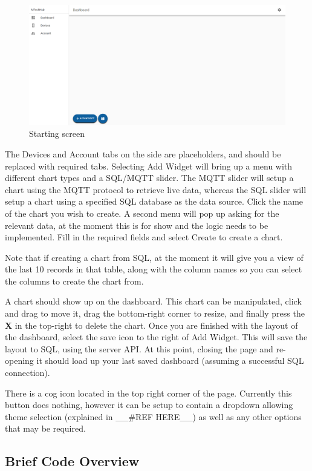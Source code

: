 \documentclass[12pt, titlepage]{article}
\begin{document}
\begin{figure}[H]
\centering
\includegraphics[width=0.9\linewidth]{./assets/Dash.PNG}
\caption{Starting screen}
\label{fig:dash}
\end{figure}

The Devices and Account tabs on the side are placeholders, and should be replaced with required tabs. Selecting Add Widget will bring up a menu with different chart types and a SQL/MQTT slider. The MQTT slider will setup a chart using the MQTT protocol to retrieve live data, whereas the SQL slider will setup a chart using a specified SQL database as the data source. Click the name of the chart you wish to create. A second menu will pop up asking for the relevant data, at the moment this is for show and the logic needs to be implemented. Fill in the required fields and select Create to create a chart.

Note that if creating a chart from SQL, at the moment it will give you a view of the last 10 records in that table, along with the column names so you can select the columns to create the chart from.

A chart should show up on the dashboard. This chart can be manipulated, click and drag to move it, drag the bottom-right corner to resize, and finally press the \textbf{X} in the top-right to delete the chart. Once you are finished with the layout of the dashboard, select the save icon to the right of Add Widget. This will save the layout to SQL, using the server API. At this point, closing the page and re-opening it should load up your last saved dashboard (assuming a successful SQL connection).

There is a cog icon located in the top right corner of the page. Currently this button does nothing, however it can be setup to contain a dropdown allowing theme selection (explained in \_\_\#REF HERE\_\_) as well as any other options that may be required.

\subsection{Brief Code Overview}
\end{document}
